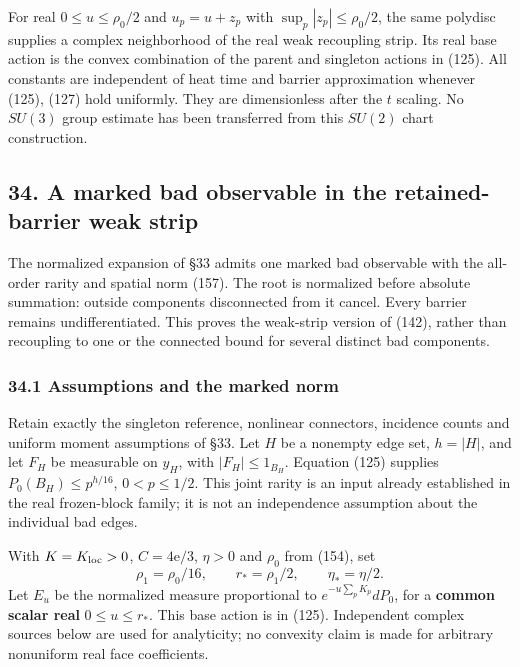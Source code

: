 \documentclass[11pt,a4paper]{article}
\begin{document}
For real \(0\le u\le\rho_0/2\) and \(u_p=u+z_p\) with
\(\sup_p|z_p|\le\rho_0/2\), the same polydisc supplies a complex
neighborhood of the real weak recoupling strip. Its real base action is
the convex combination of the parent and singleton actions in (125). All
constants are independent of heat time and barrier approximation
whenever (125), (127) hold uniformly. They are dimensionless after the
\(t\) scaling. No \(SU(3)\) group estimate has been transferred from
this \(SU(2)\) chart construction.

\hypertarget{a-marked-bad-observable-in-the-retained-barrier-weak-strip}{%
\subsection{34. A marked bad observable in the retained-barrier weak
strip}\label{a-marked-bad-observable-in-the-retained-barrier-weak-strip}}

The normalized expansion of §33 admits one marked bad observable with
the all-order rarity and spatial norm (157). The root is normalized
before absolute summation: outside components disconnected from it
cancel. Every barrier remains undifferentiated. This proves the
weak-strip version of (142), rather than recoupling to one or the
connected bound for several distinct bad components.

\hypertarget{assumptions-and-the-marked-norm}{%
\subsubsection{34.1 Assumptions and the marked
norm}\label{assumptions-and-the-marked-norm}}

Retain exactly the singleton reference, nonlinear connectors, incidence
counts and uniform moment assumptions of §33. Let \(H\) be a nonempty
edge set, \(h=|H|\), and let \(F_H\) be measurable on \(y_H\), with
\(|F_H|\le1_{B_H}\). Equation (125) supplies \(P_0(B_H)\le p^{h/16}\),
\(0<p\le1/2\). This joint rarity is an input already established in the
real frozen-block family; it is not an independence assumption about the
individual bad edges.

With \(K=K_{\rm loc}>0\), \(C=4\mathrm e/3\), \(\eta>0\) and \(\rho_0\)
from (154), set \[\rho_1=\rho_0/16,\qquad r_*=\rho_1/2,
\qquad \eta_*=\eta/2.\tag{156}\] Let \(E_u\) be the normalized measure
proportional to \(e^{-u\sum_pK_p}dP_0\), for a \textbf{common scalar
real} \(0\le u\le r_*\). This base action is in (125). Independent
complex sources below are used for analyticity; no convexity claim is
made for arbitrary nonuniform real face coefficients.
\end{document}
